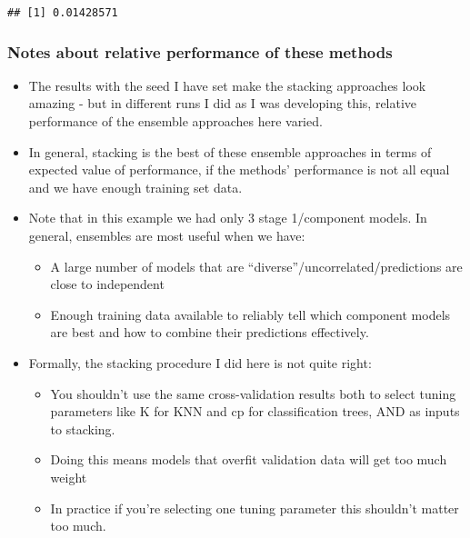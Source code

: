 \documentclass[]{article}
\newenvironment{Shaded}{\begin{snugshade}}{\end{snugshade}}
\newcommand{\CommentTok}[1]{\textcolor[rgb]{0.56,0.35,0.01}{\textit{#1}}}
\newcommand{\KeywordTok}[1]{\textcolor[rgb]{0.13,0.29,0.53}{\textbf{#1}}}
\newcommand{\NormalTok}[1]{#1}
\newcommand{\OperatorTok}[1]{\textcolor[rgb]{0.81,0.36,0.00}{\textbf{#1}}}
\newcommand{\StringTok}[1]{\textcolor[rgb]{0.31,0.60,0.02}{#1}}
\providecommand{\tightlist}{%
  \setlength{\itemsep}{0pt}\setlength{\parskip}{0pt}}
\begin{document}
\begin{Shaded}
\begin{Highlighting}[]
{{{{{{{{{\CommentTok{# Stacked model predictions}
\NormalTok{stacking_preds <-}\StringTok{ }\KeywordTok{predict}\NormalTok{(stacking_knn_fit, stacking_test_x)}
\KeywordTok{mean}\NormalTok{(ionosphere_test}\OperatorTok{$}\NormalTok{X35 }\OperatorTok{!=}\StringTok{ }\NormalTok{stacking_preds)}
\end{Highlighting}
\end{Shaded}

\begin{verbatim}
## [1] 0.01428571
\end{verbatim}

\hypertarget{notes-about-relative-performance-of-these-methods}{%
\subsubsection{Notes about relative performance of these
methods}\label{notes-about-relative-performance-of-these-methods}}

\begin{itemize}
\tightlist
\item
  The results with the seed I have set make the stacking approaches look
  amazing - but in different runs I did as I was developing this,
  relative performance of the ensemble approaches here varied.
\item
  In general, stacking is the best of these ensemble approaches in terms
  of expected value of performance, if the methods' performance is not
  all equal and we have enough training set data.
\item
  Note that in this example we had only 3 stage 1/component models. In
  general, ensembles are most useful when we have:

  \begin{itemize}
  \tightlist
  \item
    A large number of models that are
    ``diverse''/uncorrelated/predictions are close to independent
  \item
    Enough training data available to reliably tell which component
    models are best and how to combine their predictions effectively.
  \end{itemize}
\item
  Formally, the stacking procedure I did here is not quite right:

  \begin{itemize}
  \tightlist
  \item
    You shouldn't use the same cross-validation results both to select
    tuning parameters like K for KNN and cp for classification trees,
    AND as inputs to stacking.
  \item
    Doing this means models that overfit validation data will get too
    much weight
  \item
    In practice if you're selecting one tuning parameter this shouldn't
    matter too much.
  \end{itemize}
\end{itemize}
\end{document}
